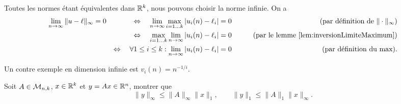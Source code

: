 Toutes les normes étant équivalentes dans $\mathbb{R}^k$, nous pouvons choisir la norme infinie.
On a
\begin{align*}
  \lim_{n \to \infty} \|u - \ell\|_\infty & = 0 & 
  \Leftrightarrow \quad \lim_{n \to \infty} \max_{i=1 \dots k} |u_i(n) - \ell_i| & = 0 & \qquad \text{(par définition de $\|\cdot\|_\infty$)} \\
  & & \Leftrightarrow  \quad \max_{i=1 \dots k} \lim_{n \to \infty} |u_i(n) - \ell_i| & = 0 & \qquad \text{(par le lemme \ref{lem:inversionLimiteMaximum})} \\
  & & \Leftrightarrow  \quad \forall 1 \leq i \leq k: \lim_{n \to \infty} |u_i(n) - \ell_i| & = 0 & 
  \qquad \text{(par définition du max)}.
\end{align*}
\eproof

\remark
Un contre exemple en dimension infinie est $v_i(n) = n^{-1/i}$.

\begin{proposition} \label{prop:normeProduitMatriceVecteur}
  Soit $A \in \mathcal{M}_{n, k}$, $x \in \mathbb{R}^k$ et $y = Ax \in \mathbb{R}^n$, montrer que 
  $$
  \|y\|_\infty \leq \|A\|_\infty \|x\|_1, \qquad
  \|y\|_1 \leq \|A\|_1 \|x\|_\infty.
  $$
\end{proposition}

